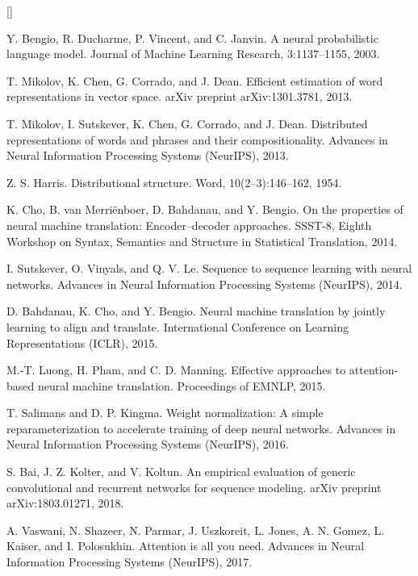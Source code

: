 \documentclass{article}
\def\beginrefs{\begin{list}
        {[\arabic{equation}]}{\usecounter{equation}
         \setlength{\leftmargin}{2.0truecm}\setlength{\labelsep}{0.4truecm}%
         \setlength{\labelwidth}{1.6truecm}}}
\def\endrefs{\end{list}}
\def\bibentry#1{\item[\hbox{[#1]}]}
\begin{document}
\beginrefs

\bibentry{1} Y. Bengio, R. Ducharme, P. Vincent, and C. Janvin. 
A neural probabilistic language model. 
Journal of Machine Learning Research, 3:1137--1155, 2003.

\bibentry{2} T. Mikolov, K. Chen, G. Corrado, and J. Dean.
Efficient estimation of word representations in vector space.
arXiv preprint arXiv:1301.3781, 2013.

\bibentry{3} T. Mikolov, I. Sutskever, K. Chen, G. Corrado, and J. Dean.
Distributed representations of words and phrases and their compositionality.
Advances in Neural Information Processing Systems (NeurIPS), 2013.

\bibentry{4} Z. S. Harris.
Distributional structure.
Word, 10(2--3):146--162, 1954.

\bibentry{5} K. Cho, B. van Merri\"enboer, D. Bahdanau, and Y. Bengio.
On the properties of neural machine translation: Encoder--decoder approaches.
SSST-8, Eighth Workshop on Syntax, Semantics and Structure in Statistical Translation, 2014.

\bibentry{6} I. Sutskever, O. Vinyals, and Q. V. Le.
Sequence to sequence learning with neural networks.
Advances in Neural Information Processing Systems (NeurIPS), 2014.

\bibentry{7} D. Bahdanau, K. Cho, and Y. Bengio.
Neural machine translation by jointly learning to align and translate.
International Conference on Learning Representations (ICLR), 2015.

\bibentry{8} M.-T. Luong, H. Pham, and C. D. Manning.
Effective approaches to attention-based neural machine translation.
Proceedings of EMNLP, 2015.

\bibentry{9} T. Salimans and D. P. Kingma.
Weight normalization: A simple reparameterization to accelerate training of deep neural networks.
Advances in Neural Information Processing Systems (NeurIPS), 2016.

\bibentry{10} S. Bai, J. Z. Kolter, and V. Koltun.
An empirical evaluation of generic convolutional and recurrent networks for sequence modeling.
arXiv preprint arXiv:1803.01271, 2018.

\bibentry{11} A. Vaswani, N. Shazeer, N. Parmar, J. Uszkoreit, L. Jones, A. N. Gomez, L. Kaiser, and I. Polosukhin.
Attention is all you need.
Advances in Neural Information Processing Systems (NeurIPS), 2017.

\endrefs
\end{document}
